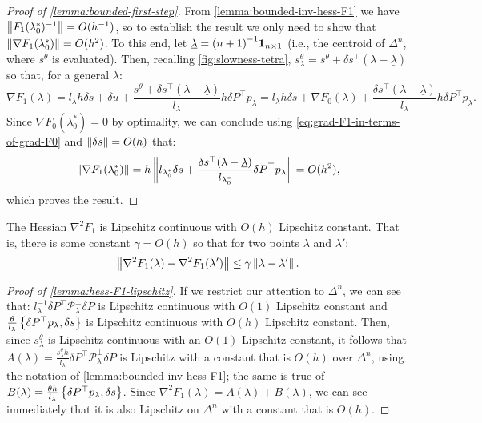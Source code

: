 \documentclass[eikonal.tex]{subfiles}
\begin{document}
\begin{proof}[Proof of \cref{lemma:bounded-first-step}]
  From \cref{lemma:bounded-inv-hess-F1} we have
  $\left\|F_1(\lambda_0^*)^{-1}\right\| = O(h^{-1})$, so to establish the
  result we only need to show that
  $\left\|\nabla F_1(\lambda_0^*)\right\| = O(h^2)$. To this end, let
  $\underline{\lambda} = {(n + 1)}^{-1} \boldsymbol{1}_{n \times 1}$ (i.e., the
  centroid of $\Delta^n$, where $s^\theta$ is evaluated). Then,
  recalling \cref{fig:slowness-tetra},
  $s^\theta_\lambda = s^\theta + \delta s^\top (\lambda -
  \underline{\lambda})$ so that, for a general $\lambda$:
  \begin{equation}
    \label{eq:grad-F1-in-terms-of-grad-F0}
    \nabla F_1(\lambda) = l_\lambda h \delta s + \delta u + \frac{s^\theta + \delta s^\top (\lambda - \underline{\lambda})}{l_\lambda} h \delta P^\top p_\lambda = l_\lambda h \delta s + \nabla F_0(\lambda) + \frac{\delta s^\top {(\lambda - \underline{\lambda})}}{l_\lambda} h \delta P^\top p_\lambda.
  \end{equation}
  Since $\nabla F_0(\lambda_0^*) = 0$ by optimality, we can conclude
  using \cref{eq:grad-F1-in-terms-of-grad-F0} and
  $\left\|\delta s\right\| = O(h)$ that:
  \begin{equation}
    \left\|\nabla F_1(\lambda_0^*)\right\| = h \left\|l_{\lambda_0^*} \delta s + \frac{\delta s^\top {(\lambda - \underline{\lambda})}}{l_{\lambda_0^*}} \delta P^\top p_\lambda\right\| = O(h^2),
  \end{equation}
  which proves the result.
\end{proof}

\begin{lemma}\label{lemma:hess-F1-lipschitz}
  The Hessian $\nabla^2 F_1$ is Lipschitz continuous with $O(h)$
  Lipschitz constant. That is, there is some constant $\gamma = O(h)$
  so that for two points $\lambda$ and $\lambda'$:
  \begin{align*}
    \left\|\nabla^2 F_1(\lambda) - \nabla^2 F_1(\lambda')\right\| \leq \gamma \left\|\lambda - \lambda'\right\|.
  \end{align*}
\end{lemma}

\begin{proof}[Proof of \cref{lemma:hess-F1-lipschitz}]
  If we restrict our attention to $\Delta^n$, we can see that:
  $l_\lambda^{-1} \delta P^\top \mathcal{P}_\lambda^\perp \delta P$ is
  Lipschitz continuous with $O(1)$ Lipschitz constant and
  $\tfrac{\theta}{l_\lambda} \left\{\delta P^\top p_\lambda, \delta
    s\right\}$ is Lipschitz continuous with $O(h)$ Lipschitz constant. Then,
  since $s^\theta_\lambda$ is Lipschitz continuous with an $O(1)$
  Lipschitz constant, it follows that
  $A(\lambda) = \tfrac{s^\theta_\lambda h}{l_\lambda} \delta P^\top
  \mathcal{P}^\perp_\lambda \delta P$ is Lipschitz with a constant
  that is $O(h)$ over $\Delta^n$, using the notation of
  \cref{lemma:bounded-inv-hess-F1}; the same is true of
  $B(\lambda) = \tfrac{\theta h}{l_\lambda} \left\{\delta P^\top
    p_\lambda, \delta s\right\}$. Since
  $\nabla^2 F_1(\lambda) = A(\lambda) + B(\lambda)$, we can see
  immediately that it is also Lipschitz on $\Delta^n$ with a constant
  that is $O(h)$.
\end{proof}
\end{document}
